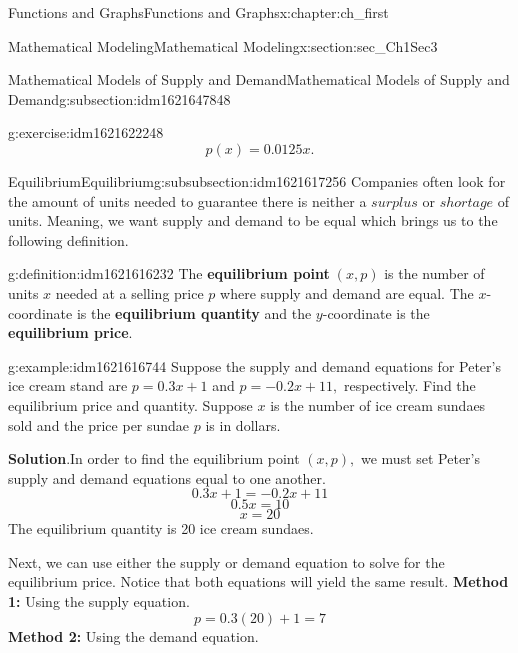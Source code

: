 \documentclass[oneside,10pt,]{book}
\newcommand{\blocktitlefont}{\relax}
\newcommand{\terminology}[1]{\textbf{#1}}
\numberwithin{equation}{section}
\begin{document}
\begin{chapterptx}{Functions and Graphs}{}{Functions and Graphs}{}{}{x:chapter:ch_first}
\begin{sectionptx}{Mathematical Modeling}{}{Mathematical Modeling}{}{}{x:section:sec_Ch1Sec3}
\begin{subsectionptx}{Mathematical Models of Supply and Demand}{}{Mathematical Models of Supply and Demand}{}{}{g:subsection:idm1621647848}
\begin{inlineexercise}{}{g:exercise:idm1621622248}
\begin{equation*}
\end{equation*}
%
\begin{equation*}
p(x)=0.0125x\text{.}
\end{equation*}
\end{inlineexercise}%
%
%
\typeout{************************************************}
\typeout{************************************************}
%
\begin{subsubsectionptx}{Equilibrium}{}{Equilibrium}{}{}{g:subsubsection:idm1621617256}
Companies often look for the amount of units needed to guarantee there is neither a \(surplus\) or \(shortage\) of units. Meaning, we want supply and demand to be equal which brings us to the following definition.%
\begin{definition}{}{g:definition:idm1621616232}%
The \terminology{equilibrium point}\(\;(x,p)\) is the number of units \(x\) needed at a selling price \(p\) where supply and demand are equal. The \(x\)-coordinate is the \terminology{equilibrium quantity} and the \(y\)-coordinate is the \terminology{equilibrium price}.\end{definition}
\begin{example}{}{g:example:idm1621616744}%
Suppose the supply and demand equations for Peter's ice cream stand are \(p=0.3x+1\) and \(p=-0.2x+11,\) respectively. Find the equilibrium price and quantity. Suppose \(x\) is the number of ice cream sundaes sold and the price per sundae \(p\) is in dollars.\par\smallskip%
\noindent\textbf{\blocktitlefont Solution}.\hypertarget{g:solution:idm1621610216}{}\quad{}In order to find the equilibrium point \((x,p),\) we must set Peter's supply and demand equations equal to one another.%
\begin{equation*}
0.3x+1=-0.2x+11
\end{equation*}
%
\begin{equation*}
0.5x=10
\end{equation*}
%
\begin{equation*}
x=20
\end{equation*}
The equilibrium quantity is 20 ice cream sundaes.%
\par
Next, we can use either the supply or demand equation to solve for the equilibrium price. Notice that both equations will yield the same result.%
\terminology{Method 1:} Using the supply equation.%
\begin{equation*}
p=0.3(20)+1=7
\end{equation*}
\terminology{Method 2:} Using the demand equation.%

\end{example}
\end{subsubsectionptx}
\end{subsectionptx}
\end{sectionptx}
\end{chapterptx}
\end{document}
